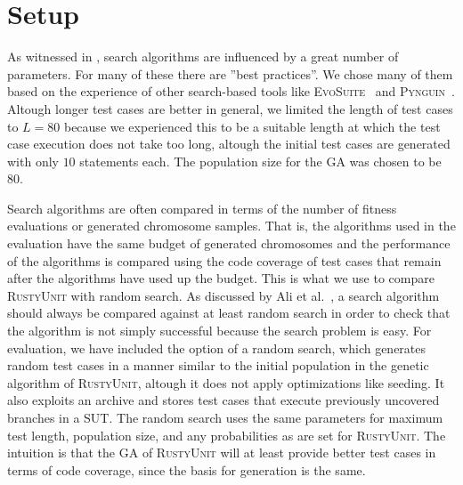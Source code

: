 \documentclass[paper=a4,%
  twoside,%
  BCOR4mm,%
  abstract=true,%
  toc=bibliography,%
  chapterprefix=true,%
  toc=bibliographynumbered,%
  open=right,%
  english,%
  pagesize=pdftex]{scrreprt}
\newcommand{\tech}{\textsc{RustyUnit}\xspace}
\begin{document}
\section{Setup}
\label{sec:environment-setup}
As witnessed in , search algorithms are influenced by a great number of parameters. For many of these there are ''best practices''. We chose many of them based on the experience of other search-based tools like \textsc{EvoSuite}~\cite{Fraser_2011a} and \textsc{Pynguin}~\cite{Lukasczyk2020}. Altough longer test cases are better in general, we limited the length of test cases to $L = 80$ because we experienced this to be a suitable length at which the test case execution does not take too long, altough the initial test cases are generated with only $10$ statements each. The population size for the \ac{GA} was chosen to be $80$.

Search algorithms are often compared in terms of the number of fitness evaluations or generated chromosome samples. That is, the algorithms used in the evaluation have the same budget of generated chromosomes and the performance of the algorithms is compared using the code coverage of test cases that remain after the algorithms have used up the budget. This is what we use to compare \tech with random search. As discussed by Ali et al.~\cite{Ali2010}, a search algorithm should always be compared against at least random search in order to check that the algorithm is not simply successful because the search problem is easy. For evaluation, we have included the option of a random search, which generates random test cases in a manner similar to the initial population in the genetic algorithm of \tech, altough it does not apply optimizations like seeding. It also exploits an archive and stores test cases that execute previously uncovered branches in a \ac{SUT}. The random search uses the same parameters for maximum test length, population size, and any probabilities as are set for \tech. The intuition is that the \ac{GA} of \tech will at least provide better test cases in terms of code coverage, since the basis for generation is the same. %

\end{document}
